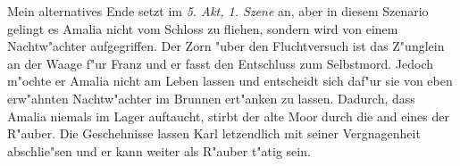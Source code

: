 Mein alternatives Ende setzt im \textit{5. Akt, 1. Szene} an, aber in diesem Szenario gelingt es Amalia nicht vom Schloss zu fliehen, sondern wird von einem Nachtw"achter aufgegriffen. Der Zorn "uber den Fluchtversuch ist das Z"unglein an der Waage f"ur Franz und er fasst den Entschluss zum Selbstmord. Jedoch m"ochte er Amalia nicht am Leben lassen und entscheidt sich daf"ur sie von eben erw"ahnten Nachtw"achter im Brunnen ert"anken zu lassen.
Dadurch, dass Amalia niemals im Lager auftaucht, stirbt der alte Moor durch die and eines der R"auber. Die Geschehnisse lassen Karl letzendlich mit seiner Vergnagenheit abschlie"sen und er kann weiter als R"auber t"atig sein.